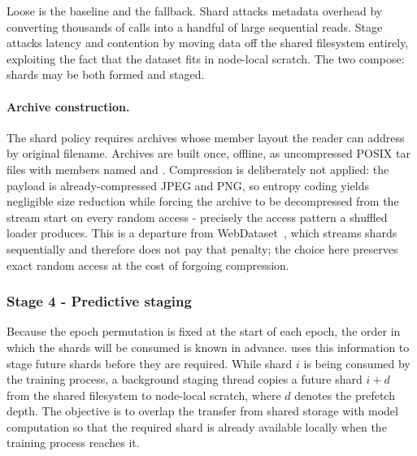 Loose is the baseline and the fallback.
Shard attacks metadata overhead by converting thousands of  calls into a
handful of large sequential reads.
Stage attacks latency and contention by moving data off the shared filesystem
entirely, exploiting the fact that the dataset fits in node-local scratch.
The two compose: shards may be both formed and staged.

\paragraph{Archive construction.}
The shard policy requires archives whose member layout the reader can address by
original filename.
Archives are built once, offline, as uncompressed POSIX tar files with members named
 and .
Compression is deliberately not applied: the payload is already-compressed JPEG and
PNG, so entropy coding yields negligible size reduction while forcing the archive to
be decompressed from the stream start on every random access - precisely the
access pattern a shuffled loader produces.
This is a departure from WebDataset~\cite{Aizman19}, which streams shards
sequentially and therefore does not pay that penalty; the choice here preserves
exact random access at the cost of forgoing compression.

\subsubsection{Stage 4 - Predictive staging}

Because the epoch permutation is fixed at the start of each epoch, the order in which the shards will be consumed is known in advance. \pads{} uses this information to stage future shards before they are required. While shard $i$ is being consumed by the training process, a background staging thread copies a future shard $i+d$ from the shared filesystem to node-local scratch, where $d$ denotes the prefetch depth. The objective is to overlap the transfer from shared storage with model computation so that the required shard is already available locally when the training process reaches it.

